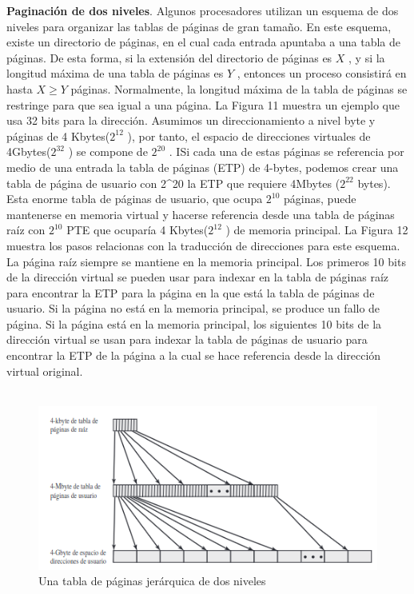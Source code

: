 \documentclass[12pt,a4paper]{article}
\begin{document}
\textbf{Paginación de dos niveles}. Algunos procesadores utilizan un esquema de dos niveles para organizar las tablas de páginas de gran tamaño. En este esquema, existe un directorio de páginas, en el cual cada entrada apuntaba a una tabla de páginas. De esta forma, si la extensión del directorio de páginas es $X$ , y si la longitud máxima de una tabla de páginas es $Y$ , entonces un proceso consistirá en hasta $X\geq Y$ páginas. Normalmente, la longitud máxima de la tabla de páginas se restringe para que sea igual a una página. La Figura 11 muestra un ejemplo que usa 32 bits para la dirección. Asumimos un direccionamiento a nivel byte y páginas de 4 Kbytes($2^{12}$ ), por tanto, el espacio de direcciones virtuales de 4Gbytes($2^{32}$ ) se compone de $2^{20}$ . ISi cada una de estas páginas se referencia por medio de una entrada la tabla de páginas (ETP) de 4-bytes, podemos crear una tabla de página de usuario con 2^{20} la ETP que requiere 4Mbytes ($2^{22}$ bytes). Esta enorme tabla de páginas de usuario, que ocupa $2^{10}$ páginas, puede mantenerse en memoria virtual y hacerse referencia desde una tabla de páginas raíz con $2^{10}$ PTE que ocuparía 4 Kbytes($2^{12}$ ) de memoria principal. La Figura 12 muestra los pasos relacionas con la traducción de direcciones para este esquema. La página raíz siempre se mantiene en la memoria principal. Los primeros 10 bits de la dirección virtual se pueden usar para indexar en la tabla de páginas raíz para encontrar la ETP para la página en la que está la tabla de páginas de usuario. Si la página no está en la memoria principal, se produce un fallo de página. Si la página está en la memoria principal, los siguientes 10 bits de la dirección virtual se usan para indexar la tabla de páginas de usuario para encontrar la ETP de la página a la cual se hace referencia desde la dirección virtual original.\\\\ 
\begin{figure}[H]
    \centering
    \includegraphics[width=15cm]{virtual2.png}
    \caption{Una tabla de páginas jerárquica de dos niveles}
\end{figure}
\end{document}
